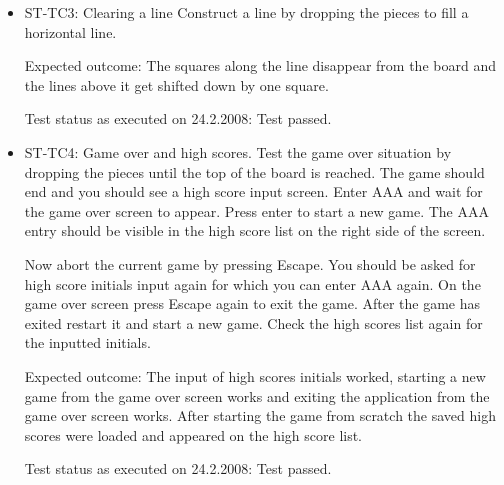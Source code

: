 \documentclass[11pt,a4paper]{article}
\begin{document}
\begin{itemize}
  \item ST-TC3: Clearing a line
    Construct a line by dropping the pieces to fill a horizontal line.

    Expected outcome: The squares along the line disappear from the board and the lines above it get shifted down by one square.

    Test status as executed on 24.2.2008: Test passed.

  \item ST-TC4: Game over and high scores.
    Test the game over situation by dropping the pieces until the top of the board is reached. The game should end and you should
    see a high score input screen. Enter AAA and wait for the game over screen to appear. Press enter to start a new game. The
    AAA entry should be visible in the high score list on the right side of the screen.

    Now abort the current game by pressing Escape. You should be asked for high score initials input again for which you can enter
    AAA again. On the game over screen press Escape again to exit the game. After the game has exited restart it and start a new
    game. Check the high scores list again for the inputted initials.

    Expected outcome: The input of high scores initials worked, starting a new game from the game over screen works and exiting
                      the application from the game over screen works. After starting the game from scratch the saved high scores
                      were loaded and appeared on the high score list.

    Test status as executed on 24.2.2008: Test passed.

\end{itemize}
\end{document}
